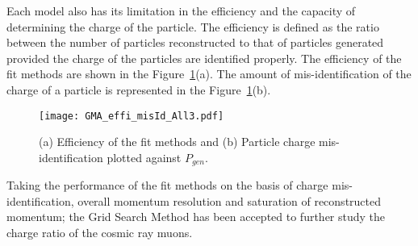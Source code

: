 Each model also has its limitation in the efficiency and the capacity of
determining the charge of the particle. The efficiency is defined as
the ratio between the number of particles reconstructed to that of
particles generated provided the charge of the particles are identified
properly. The efficiency of the fit methods are shown in the
Figure~\ref{fig:miseffi}(a).
The amount of mis-identification of the charge of a particle
is represented in the Figure~\ref{fig:miseffi}(b).
\begin{figure}[h]
  \centering
  \texttt{[image: GMA\_effi\_misId\_All3.pdf]}
  \caption{(a) Efficiency of the fit methods and (b) Particle charge
    mis-identification plotted against $P_{gen}$.}
  \label{fig:miseffi}
\end{figure}


Taking the performance of the fit methods on the basis of charge
mis-identification, overall momentum resolution and saturation of
reconstructed momentum; the Grid Search Method has been
accepted to further study the charge ratio of the cosmic ray muons.

